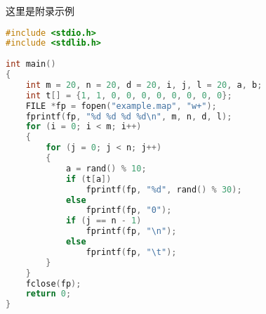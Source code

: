 \begin{Appendix}

    这里是附录示例

    
    
    \begin{lstlisting}[language=C]
#include <stdio.h>
#include <stdlib.h>
        
int main()
{
    int m = 20, n = 20, d = 20, i, j, l = 20, a, b;
    int t[] = {1, 1, 0, 0, 0, 0, 0, 0, 0, 0};
    FILE *fp = fopen("example.map", "w+");
    fprintf(fp, "%d %d %d %d\n", m, n, d, l);
    for (i = 0; i < m; i++)
    {
        for (j = 0; j < n; j++)
        {
            a = rand() % 10;
            if (t[a])
                fprintf(fp, "%d", rand() % 30);
            else
                fprintf(fp, "0");
            if (j == n - 1)
                fprintf(fp, "\n");
            else
                fprintf(fp, "\t");
        }
    }
    fclose(fp);
    return 0;
}
    \end{lstlisting}



\end{Appendix}
